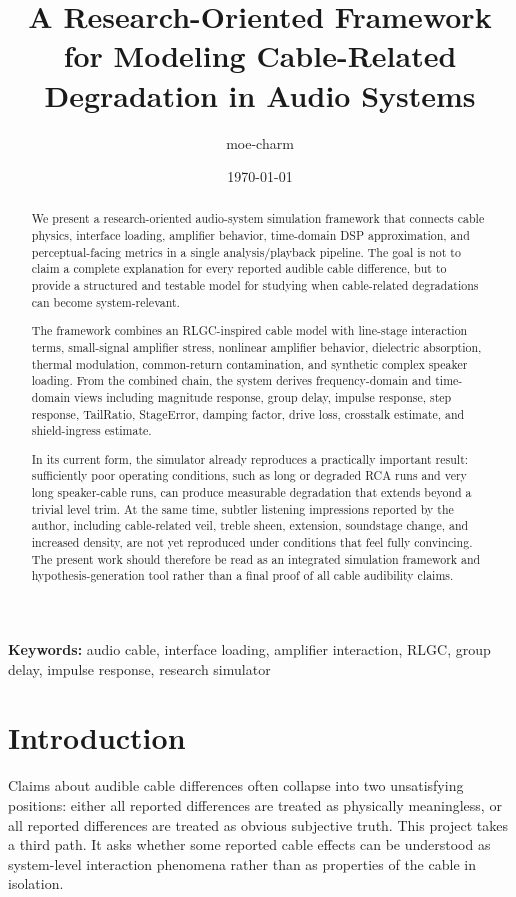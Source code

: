 \documentclass[a4paper,11pt]{article}
\title{A Research-Oriented Framework for Modeling Cable-Related Degradation in Audio Systems}
\author{moe-charm}
\date{\today}
\begin{document}
\maketitle

\begin{abstract}
We present a research-oriented audio-system simulation framework that connects
cable physics, interface loading, amplifier behavior, time-domain DSP
approximation, and perceptual-facing metrics in a single analysis/playback
pipeline. The goal is not to claim a complete explanation for every reported
audible cable difference, but to provide a structured and testable model for
studying when cable-related degradations can become system-relevant.

The framework combines an RLGC-inspired cable model with line-stage interaction
terms, small-signal amplifier stress, nonlinear amplifier behavior, dielectric
absorption, thermal modulation, common-return contamination, and synthetic
complex speaker loading. From the combined chain, the system derives
frequency-domain and time-domain views including magnitude response, group
delay, impulse response, step response, TailRatio, StageError, damping factor,
drive loss, crosstalk estimate, and shield-ingress estimate.

In its current form, the simulator already reproduces a practically important
result: sufficiently poor operating conditions, such as long or degraded RCA
runs and very long speaker-cable runs, can produce measurable degradation that
extends beyond a trivial level trim. At the same time, subtler listening
impressions reported by the author, including cable-related veil, treble sheen,
extension, soundstage change, and increased density, are not yet reproduced
under conditions that feel fully convincing. The present work should therefore
be read as an integrated simulation framework and hypothesis-generation tool
rather than a final proof of all cable audibility claims.
\end{abstract}

\textbf{Keywords:} audio cable, interface loading, amplifier interaction, RLGC,
group delay, impulse response, research simulator

\section{Introduction}

Claims about audible cable differences often collapse into two unsatisfying
positions: either all reported differences are treated as physically
meaningless, or all reported differences are treated as obvious subjective
truth. This project takes a third path. It asks whether some reported cable
effects can be understood as system-level interaction phenomena rather than as
properties of the cable in isolation.
\end{document}
